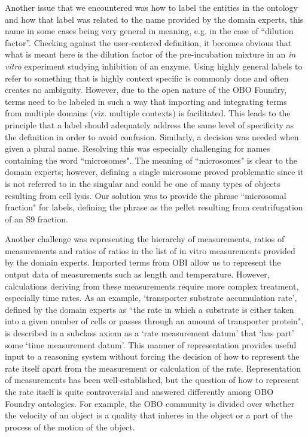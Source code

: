 \documentclass{bmcart}
\begin{document}
Another issue that we encountered was how to label the entities in the ontology and how that label was related to the name provided by the domain experts, this name in some cases being very general in meaning, e.g. in the case of ``dilution factor''.
Checking against the user-centered definition, it becomes obvious that what is meant here is the dilution factor of the pre-incubation mixture in an \textit{in vitro} experiment studying inhibition of an enzyme.
Using highly general labels to refer to something that is highly context specific is commonly done and often creates no ambiguity.
However, due to the open nature of the OBO Foundry, terms need to be labeled in such a way that importing and integrating terms from multiple domains (viz. multiple contexts) is facilitated.
This leads to the principle that a label should adequately address the same level of specificity as the definition in order to avoid confusion.
Similarly, a decision was needed when given a plural name.
Resolving this was especially challenging for names containing the word ``microsomes".
The meaning of ``microsomes" is clear to the domain experts; however, defining a single microsome proved problematic since it is not referred to in the singular and could be one of many types of objects resulting from cell lysis.
Our solution was to provide the phrase ``microsomal fraction" for  labels, defining the phrase as the pellet resulting from centrifugation of an S9 fraction.

Another challenge was representing the hierarchy of measurements, ratios of measurements and ratios of ratios in the list of in vitro measurements provided by the domain experts.
Imported terms from OBI allow us to represent the output data of measurements such as length and temperature.
However, calculations deriving from these measurements require more complex treatment, especially time rates.
As an example, `transporter substrate accumulation rate', defined by the domain experts as ``the rate in which a substrate is either taken into a given number of cells or passes through an amount of transporter protein", is described in a subclass axiom as a `rate measurement datum' that `has part' some `time measurement datum'.
This manner of representation provides useful input to a reasoning system without forcing the decision of how to represent the rate itself apart from the measurement or calculation of the rate. Representation of measurements has been well-established, but the question of how to represent the rate itself is quite controversial and answered differently among OBO Foundry ontologies.
For example, the OBO community is divided over whether the velocity of an object is a quality that inheres in the object or a part of the process of the motion of the object.
\end{document}
